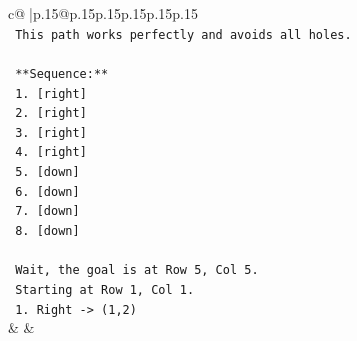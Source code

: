\documentclass{article}
\begin{document}
{\begin{supertabular}{c@{$\;$}|p{.15\linewidth}@{}p{.15\linewidth}p{.15\linewidth}p{.15\linewidth}p{.15\linewidth}p{.15\linewidth}}
{{{\\ 
\texttt{    This path works perfectly and avoids all holes.} \\
\\ 
\texttt{    **Sequence:**} \\
\texttt{    1.  {[}right{]}} \\
\texttt{    2.  {[}right{]}} \\
\texttt{    3.  {[}right{]}} \\
\texttt{    4.  {[}right{]}} \\
\texttt{    5.  {[}down{]}} \\
\texttt{    6.  {[}down{]}} \\
\texttt{    7.  {[}down{]}} \\
\texttt{    8.  {[}down{]}} \\
\\ 
\texttt{    Wait, the goal is at Row 5, Col 5.} \\
\texttt{    Starting at Row 1, Col 1.} \\
\texttt{    1. Right {-}> (1,2)} \\
            }
        }
    }
    & & \\ \\


\end{supertabular}}
\end{document}

